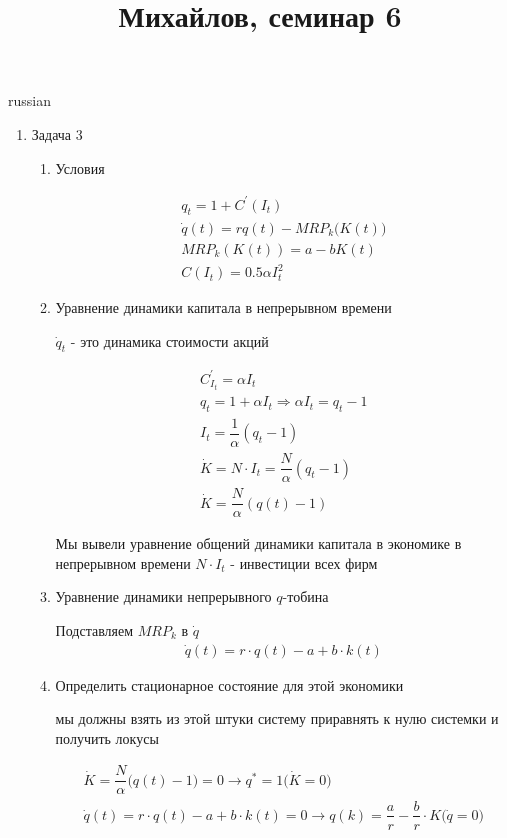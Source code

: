 \documentclass{article}
\begin{document}
\title{\foreignlanguage{russian}{Михайлов, семинар 6}}
\maketitle
\begin{otherlanguage*}{russian}

\begin{enumerate}

\item Задача 3
\begin{enumerate}
\item  Условия

\begin{align*}
q_t = 1 + C^{'} (I_t) \\ 
\dot q (t) = rq (t) - MRP_k \Big( K(t) \Big) \\
MRP_k (K(t)) = a - b K (t) \\ 
C(I_t) = 0.5 \alpha I^2_t 
\end{align*}

\item Уравнение динамики капитала в непрерывном времени 

$ \dot q_t$ - это динамика стоимости акций 

\begin{align*}
C^{'}_{I_t} = \alpha I_t \\
q_t = 1 + \alpha I_t \Rightarrow \alpha I_t = q_t - 1 \\
I_t = \dfrac{1}{\alpha} (q_t - 1) \\
\dot K = N \cdot I_t = \dfrac{N}{\alpha} (q_t - 1) \\
\dot K = \dfrac{N}{\alpha} (q(t) - 1) 
\end{align*}

Мы вывели уравнение общений динамики капитала в экономике в непрерывном времени
$ N \cdot I_t $ - инвестиции всех фирм 

\item Уравнение динамики непрерывного $q$-тобина

Подставляем $ MRP_k$ в $\dot q $ 
\begin{align*}
\dot q (t) = r \cdot q (t) - a + b \cdot k (t) 
\end{align*}

\item Определить стационарное состояние для этой экономики

мы должны взять из этой штуки систему приравнять к нулю системки и получить локусы

\begin{align*}
\dot K = \dfrac{N}{\alpha} \Big( q(t) - 1 \Big) = 0 \rightarrow q ^* = 1 \Big( \dot K = 0 \Big) \\
\dot q(t) = r \cdot q (t) - a + b \cdot k (t) = 0  \rightarrow q(k) = \dfrac{a}{r} - \dfrac{b}{r} \cdot K  \Big( \dot q = 0 \Big)
\end{align*}


\end{enumerate}
\end{enumerate}
\end{otherlanguage*}
\end{document}
